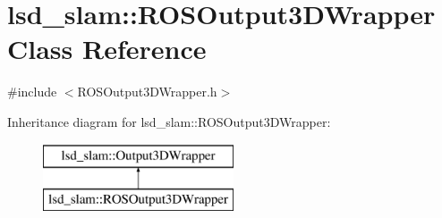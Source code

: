 \hypertarget{classlsd__slam_1_1_r_o_s_output3_d_wrapper}{\section{lsd\-\_\-slam\-:\-:R\-O\-S\-Output3\-D\-Wrapper Class Reference}
\label{classlsd__slam_1_1_r_o_s_output3_d_wrapper}
}


{\ttfamily \#include $<$R\-O\-S\-Output3\-D\-Wrapper.\-h$>$}

Inheritance diagram for lsd\-\_\-slam\-:\-:R\-O\-S\-Output3\-D\-Wrapper\-:\begin{figure}[H]
\begin{center}
\leavevmode
\includegraphics[height=2.000000cm]{classlsd__slam_1_1_r_o_s_output3_d_wrapper}
\end{center}
\end{figure}
